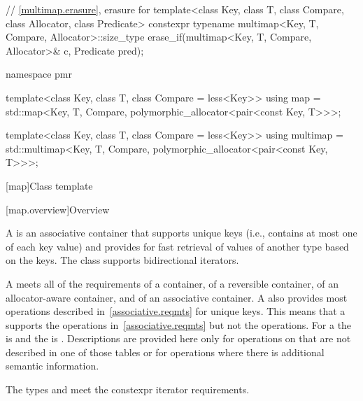 \begin{codeblock}
{  // \ref{multimap.erasure}, erasure for 
  template<class Key, class T, class Compare, class Allocator, class Predicate>
    constexpr typename multimap<Key, T, Compare, Allocator>::size_type
      erase_if(multimap<Key, T, Compare, Allocator>& c, Predicate pred);

  namespace pmr {
    template<class Key, class T, class Compare = less<Key>>
      using map = std::map<Key, T, Compare,
                           polymorphic_allocator<pair<const Key, T>>>;

    template<class Key, class T, class Compare = less<Key>>
      using multimap = std::multimap<Key, T, Compare,
                                     polymorphic_allocator<pair<const Key, T>>>;
  }
}
\end{codeblock}

[map]{Class template }

[map.overview]{Overview}

%
\pnum
A  is an associative container that
supports unique keys (i.e., contains at most one of each key value) and
provides for fast retrieval of values of another type  based
on the keys. The  class supports bidirectional iterators.

\pnum
A  meets all of the requirements of
a container,
of a reversible container,
of an allocator-aware container, and
of an associative container.
A
also provides most operations described in~\ref{associative.reqmts}
for unique keys.
This means that a
supports the
operations in~\ref{associative.reqmts}
but not the
operations.
For a
the
is
and the
is
.
Descriptions are provided here only for operations on
that are not described in one of those tables
or for operations where there is additional semantic information.

\pnum
The types  and  meet
the constexpr iterator requirements.

